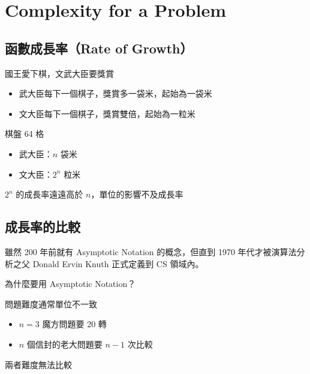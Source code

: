 \chapter{Complexity for a Problem}

\section{函數成長率（Rate of Growth）}

\begin{exercise}[棋癡國王與文武大臣]
    國王愛下棋，文武大臣要獎賞
    \begin{itemize}
        \item 武大臣每下一個棋子，獎賞多一袋米，起始為一袋米
        \item 文大臣每下一個棋子，獎賞雙倍，起始為一粒米
    \end{itemize}
\end{exercise}
\begin{answer}
    棋盤 64 格
    \begin{itemize}
        \item 武大臣：$n$ 袋米
        \item 文大臣：$2^{n}$ 粒米
    \end{itemize}
    $2^n$ 的成長率遠遠高於 $n$，單位的影響不及成長率
\end{answer}

\section{成長率的比較}

\begin{note}
    雖然 200 年前就有 Asymptotic Notation 的概念，但直到 1970 年代才被演算法分析之父 Donald Ervin Knuth 正式定義到 CS 領域內。
\end{note}

\begin{exercise}
    為什麼要用 Asymptotic Notation？
\end{exercise}
\begin{answer}
    問題難度通常單位不一致
    \begin{itemize}
        \item $n=3$ 魔方問題要 20 轉
        \item $n$ 個信封的老大問題要 $n-1$ 次比較
    \end{itemize}
    兩者難度無法比較
\end{answer}

